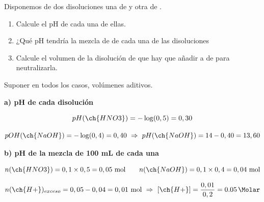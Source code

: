 \begin{exerciseEVAU}
    Disponemos de dos disoluciones una de   y otra de  .
    \begin{enumerate}[label=\letraminuscula]
        \item Calcule el pH de cada una de ellas.
        \item ¿Qué pH tendría la mezcla de  de cada una de las disoluciones
        \item Calcule el volumen de la disolución de   que hay que añadir a  de    para neutralizarla.
    \end{enumerate}
    Suponer en todos los casos, volúmenes aditivos.


    \begin{solu}


        \textbf{a) pH de cada disolución}

        \begin{equation*}
            pH(\ch{HNO3}) = -\log(0,5) = 0,30
        \end{equation*}

        \begin{equation*}
            pOH(\ch{NaOH}) = -\log(0,4) = 0,40 \ \Rightarrow \ pH(\ch{NaOH}) = 14-0,40 = 13,60
        \end{equation*}

        \textbf{b) pH de la mezcla de 100 mL de cada una}

        \begin{equation*}
            n(\ch{HNO3}) = 0,1\times0,5 = 0,05 \ \text{mol} \qquad n(\ch{NaOH}) = 0,1\times0,4 = 0,04 \ \text{mol}
        \end{equation*}

        \begin{equation*}
            n(\ch{H+})_{exceso} = 0,05-0,04 = 0,01 \ \text{mol} \ \Rightarrow \ [\ch{H+}] = \dfrac{0,01}{0,2} = \SI{0.05}{\Molar}
        \end{equation*}


\end{solu}
\end{exerciseEVAU}
